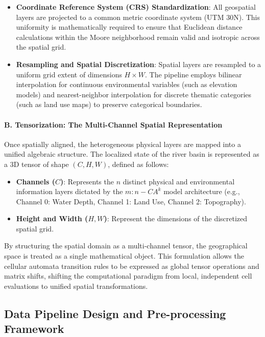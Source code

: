 \begin{itemize}
    \item \textbf{Coordinate Reference System (CRS) Standardization}: All geospatial layers are projected to a common metric coordinate 
    system (UTM 30N). This uniformity is mathematically required to ensure that Euclidean distance calculations within the Moore 
    neighborhood remain valid and isotropic across the spatial grid.

    \item \textbf{Resampling and Spatial Discretization}: Spatial layers are resampled to a uniform grid extent of dimensions $H \times W$. 
    The pipeline employs bilinear interpolation for continuous environmental variables (such as elevation models) and nearest-neighbor 
    interpolation for discrete thematic categories (such as land use maps) to preserve categorical boundaries.
\end{itemize}

\paragraph{B. Tensorization: The Multi-Channel Spatial Representation}

Once spatially aligned, the heterogeneous physical layers are mapped into a unified algebraic structure. The localized state of the river 
basin is represented as a 3D tensor of shape $(C, H, W)$, defined as follows:

\begin{itemize}
    \item \textbf{Channels ($C$)}: Represents the $n$ distinct physical and environmental information layers dictated by the $m:n-CA^k$ 
    model architecture (e.g., Channel 0: Water Depth, Channel 1: Land Use, Channel 2: Topography).

    \item \textbf{Height and Width ($H, W$)}: Represent the dimensions of the discretized spatial grid.
\end{itemize}

By structuring the spatial domain as a multi-channel tensor, the geographical space is treated as a single mathematical object. This 
formulation allows the cellular automata transition rules to be expressed as global tensor operations and matrix shifts, shifting the 
computational paradigm from local, independent cell evaluations to unified spatial transformations.


\subsection{Data Pipeline Design and Pre-processing Framework}

